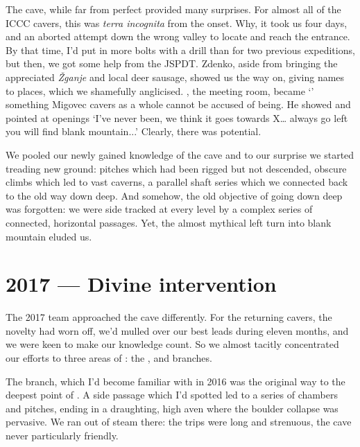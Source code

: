 The cave, while far from perfect provided many surprises. For almost all of the ICCC cavers, this was \textsl{terra incognita}  from the onset. Why, it took us four days, and an aborted attempt down the wrong valley to locate and reach the entrance. By that time, I'd put in more bolts with a drill than for two previous expeditions, but then, we got some help from the JSPDT. Zdenko, aside from bringing the appreciated \emph{\v{Z}ganje}  and local deer sausage, showed us the way on, giving names to places, which we shamefully anglicised. , the meeting room, became `' something Migovec cavers as a whole cannot be accused of being. He showed and pointed at openings `I've never been, we think it goes towards X… always go left you will find blank mountain...' Clearly, there was potential.




	

We pooled our newly gained knowledge of the cave and to our surprise we started treading new ground: pitches which had been rigged but not descended, obscure climbs which led to vast caverns, a parallel shaft series which we connected back to the old way down deep. And somehow, the old objective of going down deep was forgotten: we were side tracked at every level by a complex series of connected, horizontal passages. Yet, the almost mythical left turn into blank mountain eluded us.

\section{2017 --- Divine intervention}
The 2017 team approached the cave differently. For the returning cavers, the novelty had worn off, we'd mulled over our best leads during eleven months, and we were keen to make our knowledge count. So we almost tacitly concentrated our efforts to three areas of : the ,  and  branches.

The  branch, which I'd become familiar with in 2016 was the original way to the deepest point of . A side passage which I'd spotted led to a series of chambers and pitches, ending in a draughting, high aven where the boulder collapse was pervasive. We ran out of steam there: the trips were long and strenuous, the cave never particularly friendly.

